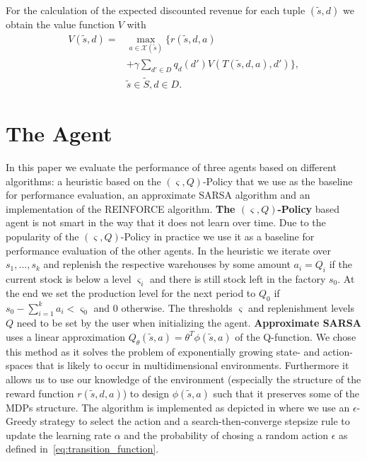\documentclass[journal, a4paper]{IEEEtran}
\theoremstyle{plain}
\theoremstyle{definition}
\begin{document}
For the calculation of the expected discounted revenue for each tuple $(\tilde{s}, d)$ we obtain the value function $V$ with\\
\begin{equation}
	\label{eq:ValueFunction}
	\begin{split}
		V(\tilde{s},d) = &\max_{a \in \mathcal{X} (\tilde{s})} \{ r(\tilde{s}, d, a)  \\
		&+ \gamma \sum_{d' \in D} q_d(d') V(T(\tilde{s}, d, a), d') \}, \\ 
		&\tilde{s} \in \tilde{S}, d \in D. 
	\end{split}
\end{equation}
\section{The Agent}
In this paper we evaluate the performance of three agents based on different algorithms: a heuristic based on the $(\varsigma, Q)$-Policy that we use as the baseline for performance evaluation, an approximate SARSA algorithm and an implementation of the REINFORCE algorithm. \newline
\textbf{The $(\varsigma, Q)$-Policy} based agent is not smart in the way that it does not learn over time. Due to the popularity of the $(\varsigma, Q)$-Policy in practice we use it as a baseline for performance evaluation of the other agents. In the heuristic we iterate over $s_1, ..., s_k$ and replenish the respective warehouses by some amount $a_i = Q_i$ if the current stock is below a level $\varsigma_i$ and there is still stock left in the factory $s_0$. At the end we set the production level for the next period to $Q_0$ if $s_0 - \sum_{i=1}^{k}a_i < \varsigma_0$ and $0$ otherwise. The thresholds $\varsigma$ and replenishment levels $Q$ need to be set by the user when initializing the agent.
\newline
\textbf{Approximate SARSA} uses a linear approximation $Q_{\theta}(\tilde{s}, a) = \theta^T \phi(\tilde{s},a)$ of the Q-function. We chose this method as it solves the problem of exponentially growing state- and action- spaces that is likely to occur in multidimensional environments. Furthermore it allows us to use our knowledge of the environment (especially the structure of the reward function $r(\tilde{s}, d, a)$) to design $\phi(\tilde{s}, a)$ such that it preserves some of the MDPs structure. The algorithm is implemented as depicted in \cite{LectureDRL} where we use an $\epsilon$-Greedy strategy to select the action and a search-then-converge stepsize rule to update the learning rate $\alpha$ and the probability of chosing a random action $\epsilon$ as defined in~\eqref{eq:transition_function}. \newline
\end{document}
